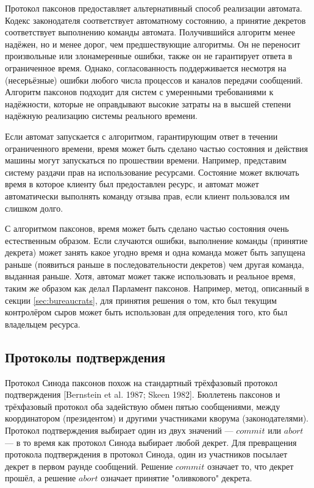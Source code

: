 \documentclass[12pt, a4paper]{article} %
\begin{document}
Протокол паксонов предоставляет альтернативный способ реализации автомата. Кодекс законодателя соответствует автоматному состоянию, а принятие декретов соответствует выполнению команды автомата. Получившийся алгоритм менее надёжен, но и менее дорог, чем предшествующие алгоритмы. Он не переносит произвольные или злонамеренные ошибки, также он не гарантирует ответа в ограниченное время. Однако, согласованность поддерживается несмотря на (несерьёзные) ошибки любого числа процессов и каналов передачи сообщений. Алгоритм паксонов подходит для систем с умеренными требованиями к надёжности, которые не оправдывают высокие затраты на в высшей степени надёжную реализацию системы реального времени.

Если автомат запускается с алгоритмом, гарантирующим ответ в течении ограниченного времени, время может быть сделано частью состояния и действия машины могут запускаться по прошествии времени. Например, представим систему раздачи прав на использование ресурсами. Состояние может включать время в которое клиенту был предоставлен ресурс, и автомат может автоматически выполнять команду отзыва прав, если клиент пользовался им слишком долго.

С алгоритмом паксонов, время может быть сделано частью состояния очень естественным образом. Если случаются ошибки, выполнение команды (принятие декрета) может занять какое угодно время и одна команда может быть запущена раньше (появиться раньше в последовательности декретов) чем другая команда, выданная раньше. Хотя, автомат может также использовать и реальное время, таким же образом как делал Парламент паксонов. Например, метод, описанный в секции \ref{sec:bureaucrats}, для принятия решения о том, кто  был текущим контролёром сыров может быть использован для определения того, кто был владельцем ресурса.

\subsection{Протоколы подтверждения}

Протокол Синода паксонов похож на стандартный трёхфазовый протокол подтверждения [Bernstein et al. 1987; Skeen 1982]. Бюллетень паксонов и трёхфазовый протокол оба задействую обмен пятью сообщениями, между координатором (президентом) и другими участниками кворума (законодателями). Протокол подтверждения выбирает один из двух значений --- $commit$ или $abort$ --- в то время как протокол Синода выбирает любой декрет. Для превращения протокола подтверждения в протокол Синода, один из участников посылает декрет в первом раунде сообщений. Решение $commit$ означает то, что декрет прошёл, а решение $abort$ означает принятие "оливкового" декрета.
\end{document}
